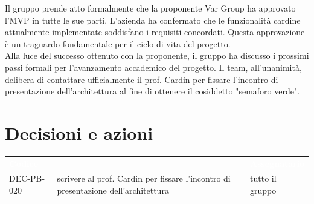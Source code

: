 \documentclass[a4paper, 11pt]{article}
\begin{document}
Il gruppo prende atto formalmente che la proponente Var Group ha approvato l'MVP in tutte le sue parti. L'azienda ha confermato che le funzionalità cardine attualmente implementate soddisfano i requisiti concordati.
Questa approvazione è un traguardo fondamentale per il ciclo di vita del progetto. \\
Alla luce del successo ottenuto con la proponente, il gruppo ha discusso i prossimi passi formali per l'avanzamento accademico del progetto. Il team, all'unanimità, delibera di contattare ufficialmente il prof. Cardin per fissare l'incontro di presentazione dell'architettura al fine di ottenere il cosiddetto "semaforo verde".

\section{Decisioni e azioni} \label{DecisioniAzioni}
\begin{center}
    \begin{tabular}{>{\centering\arraybackslash}m{3cm} >{\raggedright\arraybackslash}p{6cm} >{\centering\arraybackslash}p{3.5cm}}
        \rowcolor{AccentColor}
        \textcolor{white}{\textbf{Codice }} & 
        \multicolumn{1}{c}{\textcolor{white}{\textbf{Descrizione}}} & 
        \textcolor{white}{\textbf{Assegnatario}} \\
        DEC-PB-020 & scrivere al prof. Cardin per fissare l'incontro di presentazione dell'architettura & tutto il gruppo \\ 
    \end{tabular}
\end{center}
\end{document}
